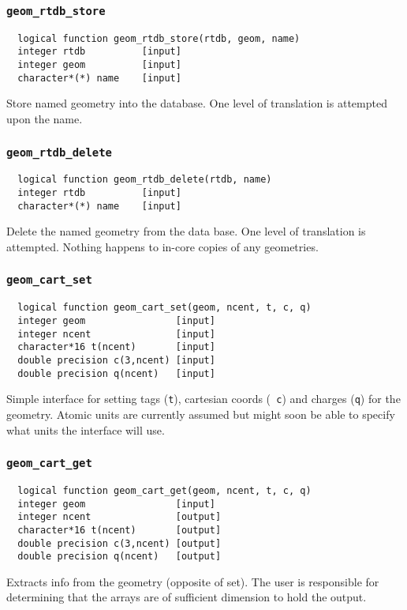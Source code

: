 \subsubsection{{\tt geom\_rtdb\_store}}
\begin{verbatim}
  logical function geom_rtdb_store(rtdb, geom, name)
  integer rtdb          [input]
  integer geom          [input]
  character*(*) name    [input]
\end{verbatim}  
Store named geometry into the database.  One level of translation is
attempted upon the name.

\subsubsection{{\tt geom\_rtdb\_delete}}
\begin{verbatim}
  logical function geom_rtdb_delete(rtdb, name)
  integer rtdb          [input]
  character*(*) name    [input]
\end{verbatim}
Delete the named geometry from the data base.  One level of
translation is attempted.  Nothing happens to in-core copies of any
geometries.

\subsubsection{{\tt geom\_cart\_set}}
\begin{verbatim}
  logical function geom_cart_set(geom, ncent, t, c, q)
  integer geom                [input]
  integer ncent               [input]
  character*16 t(ncent)       [input]
  double precision c(3,ncent) [input]
  double precision q(ncent)   [input]
\end{verbatim}
Simple interface for setting tags ({\tt t}), cartesian coords ({\tt
  c}) and charges ({\tt q}) for the geometry.  Atomic units are
currently assumed but might soon be able to specify what units the
interface will use.

\subsubsection{{\tt geom\_cart\_get}}
\begin{verbatim}
  logical function geom_cart_get(geom, ncent, t, c, q)
  integer geom                [input]
  integer ncent               [output]
  character*16 t(ncent)       [output]
  double precision c(3,ncent) [output]
  double precision q(ncent)   [output]
\end{verbatim}
Extracts info from the geometry (opposite of set).  The user is
responsible for determining that the arrays are of sufficient
dimension to hold the output.

